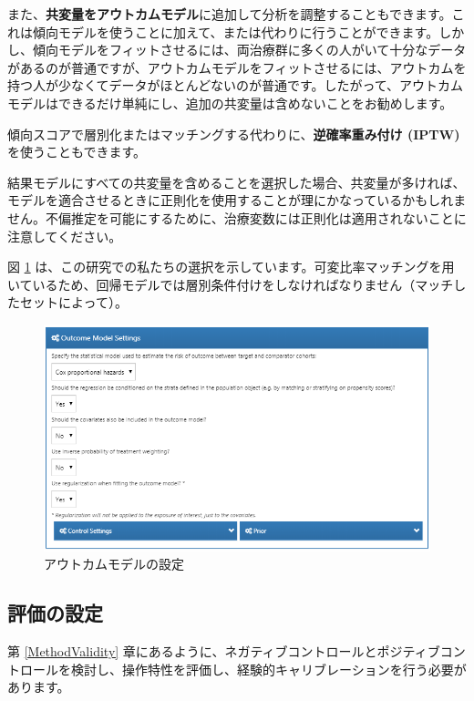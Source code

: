 \documentclass[
  11pt]{book}
\theoremstyle{definition}
\theoremstyle{definition}
\theoremstyle{definition}
\theoremstyle{definition}
\theoremstyle{remark}
\begin{document}
また、\textbf{共変量をアウトカムモデル}に追加して分析を調整することもできます。これは傾向モデルを使うことに加えて、または代わりに行うことができます。しかし、傾向モデルをフィットさせるには、両治療群に多くの人がいて十分なデータがあるのが普通ですが、アウトカムモデルをフィットさせるには、アウトカムを持つ人が少なくてデータがほとんどないのが普通です。したがって、アウトカムモデルはできるだけ単純にし、追加の共変量は含めないことをお勧めします。

傾向スコアで層別化またはマッチングする代わりに、\textbf{逆確率重み付け (IPTW)}を使うこともできます。

結果モデルにすべての共変量を含めることを選択した場合、共変量が多ければ、モデルを適合させるときに正則化を使用することが理にかなっているかもしれません。不偏推定を可能にするために、治療変数には正則化は適用されないことに注意してください。

図 \ref{fig:outcomeModelSettings} は、この研究での私たちの選択を示しています。可変比率マッチングを用いているため、回帰モデルでは層別条件付けをしなければなりません（マッチしたセットによって）。

\begin{figure}

{\centering \includegraphics[width=1\linewidth]{images/PopulationLevelEstimation/outcomeModelSettings} 

}

\caption{アウトカムモデルの設定}\label{fig:outcomeModelSettings}
\end{figure}

\subsection{評価の設定}\label{evaluationSettings}

第 \ref{MethodValidity} 章にあるように、ネガティブコントロールとポジティブコントロールを検討し、操作特性を評価し、経験的キャリブレーションを行う必要があります。
\end{document}

